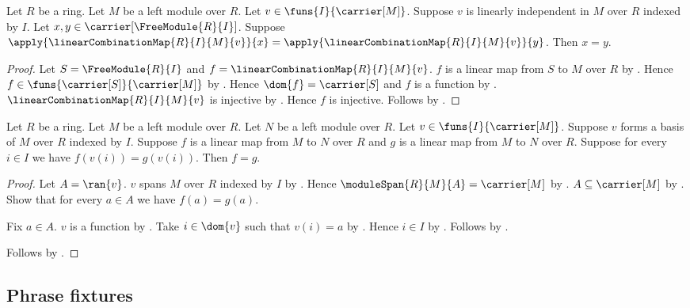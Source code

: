 \begin{theorem}\label{indexed_module_coordinate_uniqueness}
    Let $R$ be a ring.
    Let $M$ be a left module over $R$.
    Let $v\in\funs{I}{\carrier[M]}$.
    Suppose $v$ is linearly independent in $M$ over $R$ indexed by $I$.
    Let $x,y\in\carrier[\FreeModule{R}{I}]$.
    Suppose
        $\apply{\linearCombinationMap{R}{I}{M}{v}}{x}
            =\apply{\linearCombinationMap{R}{I}{M}{v}}{y}$.
    Then $x=y$.
\end{theorem}
\begin{proof}
    Let $S=\FreeModule{R}{I}$ and
        $f=\linearCombinationMap{R}{I}{M}{v}$.
    $f$ is a linear map from $S$ to $M$ over $R$ by
        .
    Hence $f\in\funs{\carrier[S]}{\carrier[M]}$ by
        .
    Hence $\dom{f}=\carrier[S]$ and $f$ is a function by
        .
    $\linearCombinationMap{R}{I}{M}{v}$ is injective by
        .
    Hence $f$ is injective.
    Follows by .
\end{proof}

\begin{theorem}\label{linear_maps_equal_on_indexed_basis}
    Let $R$ be a ring.
    Let $M$ be a left module over $R$.
    Let $N$ be a left module over $R$.
    Let $v\in\funs{I}{\carrier[M]}$.
    Suppose $v$ forms a basis of $M$ over $R$ indexed by $I$.
    Suppose $f$ is a linear map from $M$ to $N$ over $R$ and
        $g$ is a linear map from $M$ to $N$ over $R$.
    Suppose for every $i\in I$ we have $f(v(i))=g(v(i))$.
    Then $f=g$.
\end{theorem}
\begin{proof}
    Let $A=\ran{v}$.
    $v$ spans $M$ over $R$ indexed by $I$ by
        .
    Hence $\moduleSpan{R}{M}{A}=\carrier[M]$ by
        .
    $A\subseteq\carrier[M]$ by .
    Show that for every $a\in A$ we have $f(a)=g(a)$.
    \begin{subproof}
        Fix $a\in A$.
        $v$ is a function by .
        Take $i\in\dom{v}$ such that $v(i)=a$ by
            .
        Hence $i\in I$ by .
        Follows by \auto.
    \end{subproof}
    Follows by .
\end{proof}

\subsection{Phrase fixtures}

